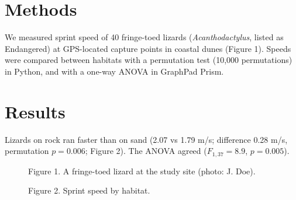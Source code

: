 \documentclass{article}
\begin{document}
\section*{Methods}
We measured sprint speed of 40 fringe-toed lizards (\emph{Acanthodactylus}, listed as Endangered) at GPS-located capture points in coastal dunes (Figure 1).
Speeds were compared between habitats with a permutation test (10,000 permutations) in Python, and with a one-way ANOVA in GraphPad Prism.
\section*{Results}
Lizards on rock ran faster than on sand (2.07 vs 1.79 m/s; difference 0.28 m/s, permutation $p = 0.006$; Figure 2).
The ANOVA agreed ($F_{1,37} = 8.9$, $p = 0.005$).
\begin{figure}\caption{Figure 1. A fringe-toed lizard at the study site (photo: J. Doe).}\end{figure}
\begin{figure}\caption{Figure 2. Sprint speed by habitat.}\end{figure}
\end{document}
